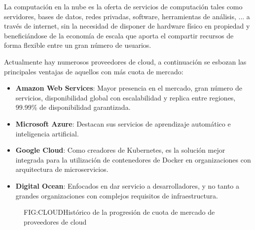 
La computación en la nube es la oferta de servicios de computación tales como servidores, bases de datos, redes privadas, software, herramientas de análisis, ... a través de internet, sin la necesidad de disponer de hardware físico en propiedad y beneficiándose de la economía de escala que aporta el compartir recursos de forma flexible entre un gran número de usuarios.

Actualmente hay numerosos proveedores de cloud, a continuación se esbozan las principales ventajas de aquellos con más cuota de mercado:

\begin{itemize}
    \item \textbf{Amazon Web Services}: Mayor presencia en el mercado, gran número de servicios, disponibilidad global con escalabilidad y replica entre regiones, 99.99\% de disponibilidad garantizada.
    \item \textbf{Microsoft Azure}: Destacan sus servicios de aprendizaje automático e inteligencia artificial.
    \item \textbf{Google Cloud}: Como creadores de Kubernetes, es la solución mejor integrada para la utilización de contenedores de Docker en organizaciones con arquitectura de microservicios.
    \item \textbf{Digital Ocean}: Enfocados en dar servicio a desarrolladores, y no tanto a grandes organizaciones con complejos requisitos de infraestructura.
\end{itemize}

\begin{figure}[Cuota de mercado]{FIG:CLOUD}{Histórico de la progresión de cuota de mercado de proveedores de cloud}
\end{figure}

\newpage
